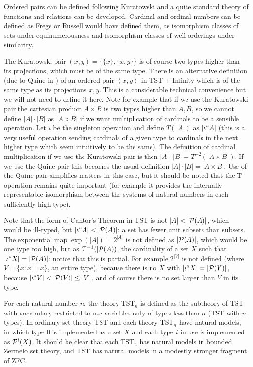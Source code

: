 \documentclass[112pt]{article}
\begin{document}
Ordered pairs can be defined following Kuratowski and a quite standard theory of functions and relations can be developed.  Cardinal and ordinal numbers can be defined as Frege or Russell would have defined them, as isomorphism classes of sets under equinumerousness and isomorphism classes of well-orderings under similarity.  

The Kuratowski pair $(x,y) = \{\{x\},\{x,y\}\}$ is of course two types higher than its projections, which must be of the same type.  There is an alternative definition (due to Quine in \cite{quinepair}) of an ordered pair
$\left< x,y\right>$ in TST + Infinity which is of the same type as its projections $x,y$.  This is a considerable technical convenience but we will not need to define it here.  Note for example that if we use the Kuratowski pair the cartesian product $A \times B$ is two types higher than $A,B$, so we cannot define $|A| \cdot |B|$ as $|A \times B|$ if we want multiplication of cardinals to be a sensible operation.  Let $\iota$ be the singleton operation and define $T(|A|)$ as $|\iota``A|$ (this is a very useful operation sending cardinals of a given type to cardinals in the next higher type which seem intuitively to be the same).  The definition of cardinal multiplication if we use the Kuratowski pair is then $|A| \cdot |B| =T^{-2}(|A\times B|)$.  If we use the Quine pair this becomes the usual definition $|A| \cdot |B| =|A\times B|$.  Use of the Quine pair simplifies matters in this case, but it should be noted that the T operation remains quite important (for example it provides the internally representable isomorphism between the systems of natural numbers in each sufficiently high type).

Note that the form of Cantor's Theorem in TST is not $|A| < |{\cal P}(A)|$, which would be ill-typed, but $|\iota``A|<|{\cal P}(A)|$:  a set has fewer unit subsets than subsets.  The exponential map $\exp(|A|) = 2^{|A|}$ is not defined as $|{\cal P}(A)|$, which would be one type too high, but as $T^{-1}(|{\cal P}(A))$, the cardinality of a set $X$ such that $|\iota``X| = |{\cal P}(A)|$;   notice that this is partial.  For example
$2^{|V|}$ is not defined (where $V=\{x:x=x\}$, an entire type), because there is no $X$ with $|\iota``X|=|{\cal P}(V)|$, because $|\iota``V|<|{\cal P}(V)| \leq |V|$, and of course there is no set larger than $V$ in its type.

For each natural number $n$, the theory TST$_n$ is defined as the subtheory of TST with vocabulary restricted to use variables only of types less than $n$ (TST with $n$ types).
In ordinary set theory TST and each theory TST$_n$ have natural models, in which type 0 is implemented as a set $X$ and each type $i$ in use is implemented as ${\cal P}^i(X)$.  It should be clear that each TST$_n$ has natural models in bounded Zermelo set theory, and TST has natural models in a modestly stronger fragment of ZFC.
\end{document}
